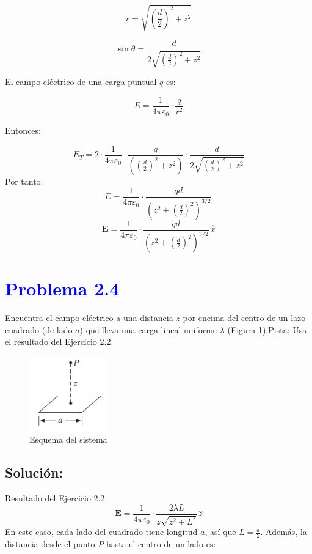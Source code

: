 \documentclass[12pt]{article}
\newcommand{\question}[1]{\textcolor{blue}{\textbf{#1}}}
\begin{document}
\[
r = \sqrt{\left( \frac{d}{2} \right)^2 + z^2}
\]

\[
\sin \theta = \frac{d}{2 \sqrt{\left( \frac{d}{2} \right)^2 + z^2}}
\]

El campo eléctrico de una carga puntual \( q \) es:

\[
E = \frac{1}{4\pi \varepsilon_0} \cdot \frac{q}{r^2}
\]

Entonces:

\[
E_T = 2 \cdot \frac{1}{4\pi \varepsilon_0} \cdot \frac{q}{\left( \left( \frac{d}{2} \right)^2 + z^2 \right)} \cdot \frac{d}{2 \sqrt{\left( \frac{d}{2} \right)^2 + z^2}}
\]
Por tanto: 
\[
\boxed{
{E} = \frac{1}{4\pi\varepsilon_0} \cdot \frac{qd}{\left(z^2 + \left(\frac{d}{2}\right)^2\right)^{3/2}} \,
}
\]
\[
\boxed{
\mathbf{E} = \frac{1}{4\pi\varepsilon_0} \cdot \frac{qd}{\left(z^2 + \left(\frac{d}{2}\right)^2\right)^{3/2}} \, \hat{x}
}
\]

\section*{\question{Problema 2.4} }Encuentra el campo eléctrico a una distancia \( z \) por encima del centro de un lazo cuadrado (de lado \( a \)) que lleva una carga lineal uniforme \( \lambda \) (Figura \ref{figura2}).Pista: Usa el resultado del Ejercicio 2.2.

\begin{figure}[ht] 
    \centering
    \includegraphics[width=0.3\textwidth]{imagenes/eje2.4.png} 
    \caption{Esquema del sistema}
    \label{figura2}
\end{figure}

\subsection*{Solución:}
Resultado del Ejercicio 2.2:
\[
 \mathbf{E} = \frac{1}{4\pi\varepsilon_0} \cdot \frac{2\lambda L}{z \sqrt{z^2 + L^2}} \, \hat{z}
\]
En este  caso, cada lado del cuadrado tiene longitud $a$, así que $L = \frac{a}{2}$. Además, la distancia desde el punto $P$ hasta el centro de un lado es:
\end{document}
